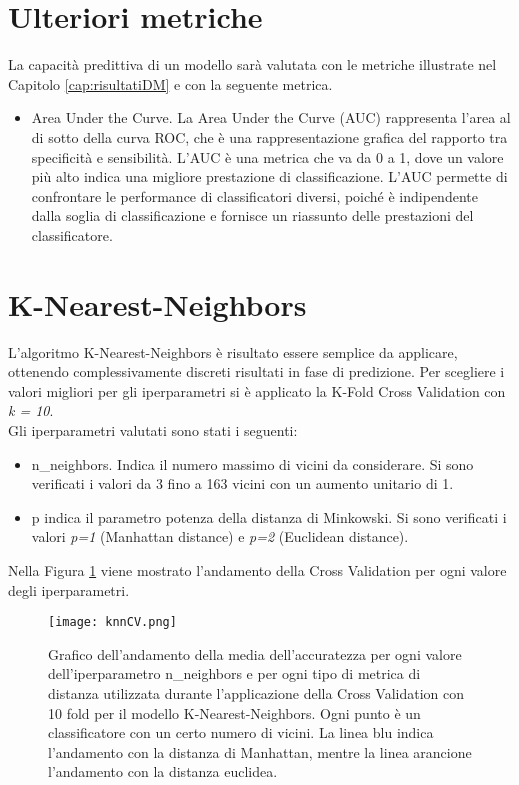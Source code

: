 \section{Ulteriori metriche}
La capacità predittiva di un modello sarà valutata con le metriche illustrate nel Capitolo \ref{cap:risultatiDM} e con la seguente metrica.
\begin{itemize}
	
	\item \textsf{Area Under the Curve}. La Area Under the Curve (AUC) rappresenta l'area al di sotto della curva ROC, che è una rappresentazione grafica del rapporto tra specificità e sensibilità.
	L'AUC è una metrica che va da 0 a 1, dove un valore più alto indica una migliore prestazione di classificazione. L'AUC permette di confrontare le performance di classificatori diversi, poiché è indipendente dalla soglia di classificazione e fornisce un riassunto delle prestazioni del classificatore.
\end{itemize}

\section{K-Nearest-Neighbors}
L'algoritmo K-Nearest-Neighbors è risultato essere semplice da applicare, ottenendo complessivamente discreti risultati in fase di predizione. Per scegliere i valori migliori per gli iperparametri si è applicato la K-Fold Cross Validation con \emph{k = 10}.\\
Gli iperparametri valutati sono stati i seguenti:
\begin{itemize}
	\item \textsf{n\_neighbors}. Indica il numero massimo di vicini da considerare. Si sono verificati i valori da 3 fino a 163 vicini con un aumento unitario di 1.
	\item \textsf{p} indica il parametro potenza della distanza di Minkowski. Si sono verificati i valori \emph{p=1} (Manhattan distance) e \emph{p=2} (Euclidean distance).
\end{itemize}

Nella Figura \ref{fig:knnCV} viene mostrato l'andamento della Cross Validation per ogni valore degli iperparametri.
\begin{figure}[h]
	\begin{center}
		\texttt{[image: knnCV.png]}
		\caption{Grafico dell'andamento della media dell'accuratezza per ogni valore dell'iperparametro \textsf{n\_neighbors} e per ogni tipo di metrica di distanza utilizzata durante l'applicazione della Cross Validation con 10 fold per il modello K-Nearest-Neighbors. Ogni punto è un classificatore con un certo numero di vicini. La linea blu indica l'andamento con la distanza di Manhattan, mentre la linea arancione l'andamento con la distanza euclidea.
		} 
		\label{fig:knnCV}
	\end{center}
\end{figure}

